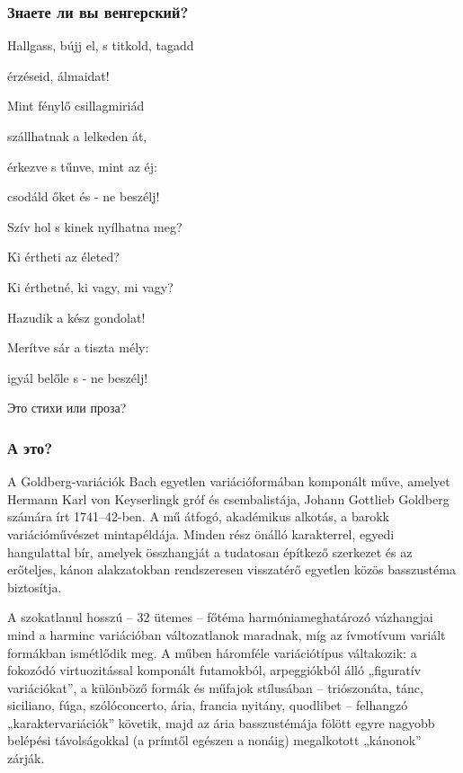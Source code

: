 \documentclass{beamer}
\begin{document}

\begin{frame}
\frametitle{Знаете ли вы венгерский?}

\begin{flushleft}
Hallgass, bújj el, s titkold, tagadd 

érzéseid, álmaidat! 

Mint fénylő csillagmiriád 

szállhatnak a lelkeden át, 

érkezve s tűnve, mint az éj: 

csodáld őket és - ne beszélj!

\end{flushleft}

\begin{flushleft}

Szív hol s kinek nyílhatna meg? 

Ki értheti az életed? 

Ki érthetné, ki vagy, mi vagy? 

Hazudik a kész gondolat! 

Merítve sár a tiszta mély: 

igyál belőle s - ne beszélj!

\end{flushleft}

Это стихи или проза?


\end{frame}


\begin{frame}
\frametitle{А это?}

A Goldberg-variációk Bach egyetlen variációformában komponált műve, amelyet Hermann Karl von Keyserlingk gróf és csembalistája, Johann Gottlieb Goldberg számára írt 1741–42-ben. A mű átfogó, akadémikus alkotás, a barokk variációművészet mintapéldája. Minden rész önálló karakterrel, egyedi hangulattal bír, amelyek összhangját a tudatosan építkező szerkezet és az erőteljes, kánon alakzatokban rendszeresen visszatérő egyetlen közös basszustéma biztosítja.

A szokatlanul hosszú – 32 ütemes – főtéma harmóniameghatározó vázhangjai mind a harminc variációban változatlanok maradnak, míg az ívmotívum variált formákban ismétlődik meg. A műben háromféle variációtípus váltakozik: a fokozódó virtuozitással komponált futamokból, arpeggiókból álló „figuratív variációkat”, a különböző formák és műfajok stílusában – triószonáta, tánc, siciliano, fúga, szólóconcerto, ária, francia nyitány, quodlibet – felhangzó „karaktervariációk” követik, majd az ária basszustémája fölött egyre nagyobb belépési távolságokkal (a prímtől egészen a nonáig) megalkotott „kánonok” zárják. 

\end{frame}
\end{document}

